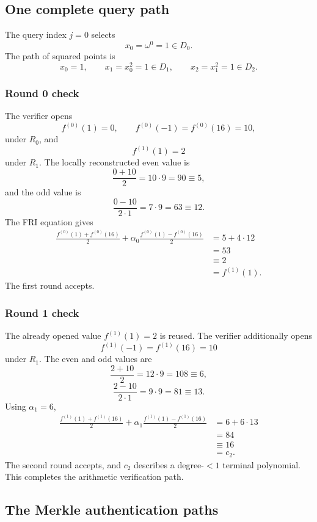 \subsection{One complete query path}

The query index $j=0$ selects
\[
    x_0=\omega^0=1\in D_0.
\]
The path of squared points is
\[
    x_0=1,
    \qquad
    x_1=x_0^2=1\in D_1,
    \qquad
    x_2=x_1^2=1\in D_2.
\]

\subsubsection*{Round 0 check}

The verifier opens
\[
    f^{(0)}(1)=0,
    \qquad
    f^{(0)}(-1)=f^{(0)}(16)=10,
\]
under $R_0$, and
\[
    f^{(1)}(1)=2
\]
under $R_1$. The locally reconstructed even value is
\[
    \frac{0+10}{2}=10\cdot9=90\equiv5,
\]
and the odd value is
\[
    \frac{0-10}{2\cdot1}
    =7\cdot9
    =63
    \equiv12.
\]
The FRI equation gives
\[
\begin{aligned}
\frac{f^{(0)}(1)+f^{(0)}(16)}2
+\alpha_0
 \frac{f^{(0)}(1)-f^{(0)}(16)}{2}
&=5+4\cdot12\\
&=53\\
&\equiv2\\
&=f^{(1)}(1).
\end{aligned}
\]
The first round accepts.

\subsubsection*{Round 1 check}

The already opened value $f^{(1)}(1)=2$ is reused. The verifier additionally opens
\[
    f^{(1)}(-1)=f^{(1)}(16)=10
\]
under $R_1$. The even and odd values are
\[
    \frac{2+10}{2}=12\cdot9=108\equiv6,
\]
\[
    \frac{2-10}{2\cdot1}=9\cdot9=81\equiv13.
\]
Using $\alpha_1=6$,
\[
\begin{aligned}
\frac{f^{(1)}(1)+f^{(1)}(16)}2
+\alpha_1
 \frac{f^{(1)}(1)-f^{(1)}(16)}2
&=6+6\cdot13\\
&=84\\
&\equiv16\\
&=c_2.
\end{aligned}
\]
The second round accepts, and $c_2$ describes a degree-$<1$ terminal polynomial. This
completes the arithmetic verification path.

\subsection{The Merkle authentication paths}

